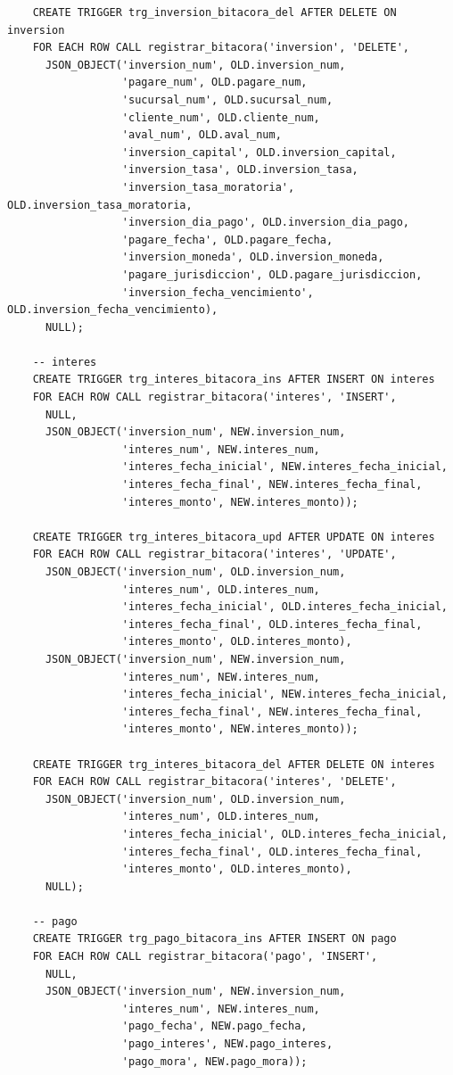 \begin{verbatim}
	CREATE TRIGGER trg_inversion_bitacora_del AFTER DELETE ON inversion
	FOR EACH ROW CALL registrar_bitacora('inversion', 'DELETE',
	  JSON_OBJECT('inversion_num', OLD.inversion_num,
	              'pagare_num', OLD.pagare_num,
	              'sucursal_num', OLD.sucursal_num,
	              'cliente_num', OLD.cliente_num,
	              'aval_num', OLD.aval_num,
	              'inversion_capital', OLD.inversion_capital,
	              'inversion_tasa', OLD.inversion_tasa,
	              'inversion_tasa_moratoria', OLD.inversion_tasa_moratoria,
	              'inversion_dia_pago', OLD.inversion_dia_pago,
	              'pagare_fecha', OLD.pagare_fecha,
	              'inversion_moneda', OLD.inversion_moneda,
	              'pagare_jurisdiccion', OLD.pagare_jurisdiccion,
	              'inversion_fecha_vencimiento', OLD.inversion_fecha_vencimiento),
	  NULL);

	-- interes
	CREATE TRIGGER trg_interes_bitacora_ins AFTER INSERT ON interes
	FOR EACH ROW CALL registrar_bitacora('interes', 'INSERT',
	  NULL,
	  JSON_OBJECT('inversion_num', NEW.inversion_num,
	              'interes_num', NEW.interes_num,
	              'interes_fecha_inicial', NEW.interes_fecha_inicial,
	              'interes_fecha_final', NEW.interes_fecha_final,
	              'interes_monto', NEW.interes_monto));

	CREATE TRIGGER trg_interes_bitacora_upd AFTER UPDATE ON interes
	FOR EACH ROW CALL registrar_bitacora('interes', 'UPDATE',
	  JSON_OBJECT('inversion_num', OLD.inversion_num,
	              'interes_num', OLD.interes_num,
	              'interes_fecha_inicial', OLD.interes_fecha_inicial,
	              'interes_fecha_final', OLD.interes_fecha_final,
	              'interes_monto', OLD.interes_monto),
	  JSON_OBJECT('inversion_num', NEW.inversion_num,
	              'interes_num', NEW.interes_num,
	              'interes_fecha_inicial', NEW.interes_fecha_inicial,
	              'interes_fecha_final', NEW.interes_fecha_final,
	              'interes_monto', NEW.interes_monto));

	CREATE TRIGGER trg_interes_bitacora_del AFTER DELETE ON interes
	FOR EACH ROW CALL registrar_bitacora('interes', 'DELETE',
	  JSON_OBJECT('inversion_num', OLD.inversion_num,
	              'interes_num', OLD.interes_num,
	              'interes_fecha_inicial', OLD.interes_fecha_inicial,
	              'interes_fecha_final', OLD.interes_fecha_final,
	              'interes_monto', OLD.interes_monto),
	  NULL);

	-- pago
	CREATE TRIGGER trg_pago_bitacora_ins AFTER INSERT ON pago
	FOR EACH ROW CALL registrar_bitacora('pago', 'INSERT',
	  NULL,
	  JSON_OBJECT('inversion_num', NEW.inversion_num,
	              'interes_num', NEW.interes_num,
	              'pago_fecha', NEW.pago_fecha,
	              'pago_interes', NEW.pago_interes,
	              'pago_mora', NEW.pago_mora));


\end{verbatim}
